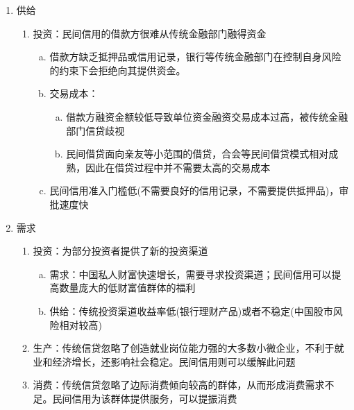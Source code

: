 \documentclass[12pt]{book}
\begin{document}
\begin{enumerate}[1.]
    \item 供给
          \begin{enumerate}[(1)]
              \item 投资：民间信用的借款方很难从传统金融部门融得资金
                    \begin{enumerate}[a.]
                        \item 借款方缺乏抵押品或信用记录，银行等传统金融部门在控制自身风险的约束下会拒绝向其提供资金。
                        \item 交易成本：
                              \begin{enumerate}[(a)]
                                  \item 借款方融资金额较低导致单位资金融资交易成本过高，被传统金融部门信贷歧视
                                  \item 民间借贷面向亲友等小范围的借贷，合会等民间借贷模式相对成熟，因此在借贷过程中并不需要太高的交易成本
                              \end{enumerate}
                        \item 民间信用准入门槛低(不需要良好的信用记录，不需要提供抵押品)，审批速度快
                    \end{enumerate}
          \end{enumerate}
    \item 需求
          \begin{enumerate}[(1)]
              \item 投资：为部分投资者提供了新的投资渠道
                    \begin{enumerate}[a.]
                        \item 需求：中国私人财富快速增长，需要寻求投资渠道；民间信用可以提高数量庞大的低财富值群体的福利
                        \item 供给：传统投资渠道收益率低(银行理财产品)或者不稳定(中国股市风险相对较高)
                    \end{enumerate}
              \item 生产：传统信贷忽略了创造就业岗位能力强的大多数小微企业，不利于就业和经济增长，还影响社会稳定。民间信用则可以缓解此问题
              \item 消费：传统信贷忽略了边际消费倾向较高的群体，从而形成消费需求不足。民间信用为该群体提供服务，可以提振消费
          \end{enumerate}
\end{enumerate}
\end{document}
